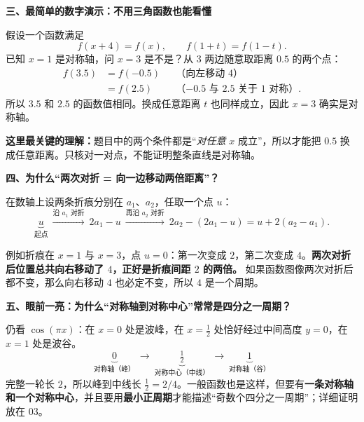 \clearpage
\begin{explanationbox}
\textbf{\textcolor{CExplanation}{三、最简单的数字演示：不用三角函数也能看懂}}



假设一个函数满足
\[
f(x+4)=f(x),\qquad f(1+t)=f(1-t).
\]
已知 $x=1$ 是对称轴，问 $x=3$ 是不是？从 $3$ 两边随意取距离 $0.5$ 的两个点：
\[
\begin{aligned}
f(3.5)&=f(-0.5) &&\text{（向左移动 $4$）}\\
       &=f(2.5) &&\text{（$-0.5$ 与 $2.5$ 关于 $1$ 对称）}.
\end{aligned}
\]
所以 $3.5$ 和 $2.5$ 的函数值相同。换成任意距离 $t$ 也同样成立，因此 $x=3$ 确实是对称轴。

\textbf{这里最关键的理解：}题目中的两个条件都是“\emph{对任意} $x$ 成立”，所以才能把 $0.5$ 换成任意距离。只核对一对点，不能证明整条直线是对称轴。

\medskip

\end{explanationbox}
\clearpage
\begin{explanationbox}
\textbf{\textcolor{CExplanation}{四、为什么“两次对折 = 向一边移动两倍距离”？}}



在数轴上设两条折痕分别在 $a_1$、$a_2$，任取一个点 $u$：
\[
\underbrace{u}_{\text{起点}}
\ \xrightarrow{\text{沿 $a_1$ 对折}}\
2a_1-u
\ \xrightarrow{\text{再沿 $a_2$ 对折}}\
2a_2-(2a_1-u)=u+2(a_2-a_1).
\]

例如折痕在 $x=1$ 与 $x=3$，点 $u=0$：第一次变成 $2$，第二次变成 $4$。\textbf{两次对折后位置总共向右移动了 $4$，正好是折痕间距 $2$ 的两倍。} 如果函数图像两次对折后都不变，那么向右移动 $4$ 也必定不变，所以 $4$ 是一个周期。

\medskip

\end{explanationbox}
\clearpage
\begin{explanationbox}
\textbf{\textcolor{CExplanation}{五、眼前一亮：为什么“对称轴到对称中心”常常是四分之一周期？}}



仍看 $\cos(\pi x)$：在 $x=0$ 处是波峰，在 $x=\tfrac12$ 处恰好经过中间高度 $y=0$，在 $x=1$ 处是波谷。
\[
\underbrace{0}_{\text{对称轴（峰）}}
\ \longrightarrow\
\underbrace{\tfrac12}_{\text{对称中心（中线）}}
\ \longrightarrow\
\underbrace{1}_{\text{对称轴（谷）}}
\]
完整一轮长 $2$，所以峰到中线长 $\tfrac12=2/4$。一般函数也是这样，但要有\textbf{一条对称轴和一个对称中心}，并且要用\textbf{最小正周期}才能描述“奇数个四分之一周期”；详细证明放在 03。

\medskip

\end{explanationbox}
